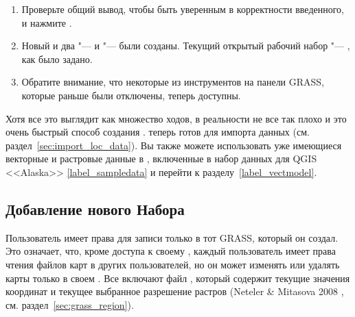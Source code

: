 \begin{enumerate}
  нового . Вы можете называть его как угодно "--- мы
  используем имя <<demo>>.
  \footnote{Когда создается новый , GRASS автоматически
  создает специальный , называемый ,
  спроектированный для хранения главных данных проекта, его исходного
  пространственного охвата и определений системы координат
  (Neteler \& Mitasova 2008 \cite{neteler_mitasova08}).}
  \item Проверьте общий вывод, чтобы быть уверенным в корректности
  введенного, и нажмите .
  \item Новый  и два  "---
   и  "--- были созданы. Текущий
  открытый рабочий набор "--- , как было задано.
  \item Обратите внимание, что некоторые из инструментов на панели
  GRASS, которые раньше были отключены, теперь доступны.
\end{enumerate}

Хотя все это выглядит как множество ходов, в реальности не все так плохо
и это очень быстрый способ создания .
 теперь готов для импорта данных (см.
раздел~\ref{sec:import_loc_data}). Вы также можете использовать уже
имеющиеся векторные и растровые данные в ,
включенные в набор данных для QGIS <<Alaska>> \ref{label_sampledata} и
перейти к разделу~\ref{label_vectmodel}.

\subsection{Добавление нового Набора}\label{sec:add_mapset}

Пользователь имеет права для записи только в тот 
GRASS, который он создал. Это означает, что, кроме доступа к своему
, каждый пользователь имеет права чтения файлов карт в
 других пользователей, но он может изменять или
удалять карты только в своем . Все 
включают файл , который содержит текущие значения
координат и текущее выбранное разрешение растров (Neteler \& Mitasova 2008
\cite{neteler_mitasova08}, см. раздел~\ref{sec:grass_region}).

